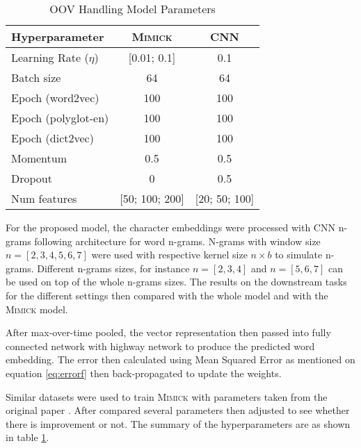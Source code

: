         \begin{table}[]
            \centering
            \caption{OOV Handling Model Parameters}
            \label{tab:hyperparameter}
            \begin{tabular}{@{}lcc@{}}
                \toprule
                \textbf{Hyperparameter} & \multicolumn{1}{c}{\textbf{\textsc{Mimick}}} & \multicolumn{1}{c}{\textbf{CNN}} \\ \midrule
                Learning Rate ($\eta$) & [0.01; 0.1] & 0.1 \\
                Batch size & 64 & 64 \\
                Epoch (word2vec) & 100 & 100 \\
                Epoch (polyglot-en) & 100 & 100 \\
                Epoch (dict2vec) & 100 & 100 \\
                Momentum & 0.5 & 0.5 \\
                Dropout & 0 & 0.5 \\
                Num features & [50; 100; 200] & [20; 50; 100] \\ \bottomrule
            \end{tabular}
        \end{table}

        For the proposed model, the character embeddings were
        processed with CNN n-grams following
        \cite{convolutional2014kim} architecture for word n-grams.
        N-grams with window size $n = [2, 3, 4, 5, 6, 7]$ were used
        with respective kernel size $n \times b$ to simulate n-grams.
        Different n-grams sizes, for instance $n = [2, 3, 4]$ and $n =
        [5, 6, 7]$ can be used on top of the whole n-grams sizes. The
        results on the downstream tasks for the different settings
        then compared with the whole model and with the
        \textsc{Mimick} model.
        
        After max-over-time pooled, the vector representation then
        passed into fully connected network with highway network to
        produce the predicted word embedding. The error then
        calculated using Mean Squared Error as mentioned on equation
        \ref{eq:errorf} then back-propagated to update the weights.

        Similar datasets were used to train \textsc{Mimick} with
        parameters taken from the original paper
        \citep{mimicking2017Pinter}. After compared several parameters
        then adjusted to see whether there is improvement or not. The
        summary of the hyperparameters are as shown in table
        \ref{tab:hyperparameter}.

